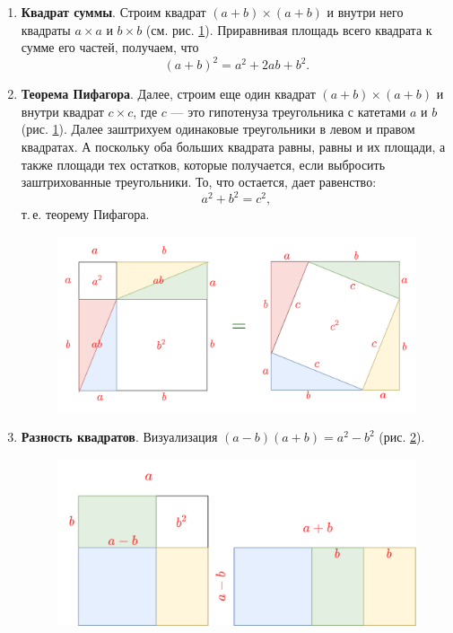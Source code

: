\begin{enumerate}
\item \textbf{Квадрат суммы}. Строим квадрат $(a+b)\times (a+b)$ и внутри него квадраты $a\times a$ и $b\times b$ (см. рис. \ref{pithagor}). Приравнивая площадь всего квадрата к сумме его частей, получаем, что
$$
(a+b)^2 = a^2 + 2ab + b^2.
$$
\item \textbf{Теорема Пифагора}. Далее, строим еще один квадрат $(a+b)\times (a+b)$ и внутри квадрат $c\times c$, где $c$ --- это гипотенуза треугольника с катетами $a$ и $b$ (рис. \ref{pithagor}). Далее заштрихуем одинаковые треугольники в левом и правом квадратах. А поскольку оба больших квадрата равны, равны и их площади, а также площади тех остатков, которые получается, если выбросить заштрихованные треугольники. То, что остается, дает равенство:
$$
a^2+b^2=c^2,
$$
т.\,е. теорему Пифагора.

\begin{figure}[hbt!]
\begin{center}
\includegraphics[scale=0.25]{pithagor.png}
\end{center}
\caption{}\label{pithagor}
\end{figure}

\item \textbf{Разность квадратов}. Визуализация $(a-b)(a+b)=a^2-b^2$ (рис. \ref{razn}).
\begin{figure}[hbt!]
\begin{center}
\includegraphics[scale=0.25]{razn.png}
\end{center}
\caption{}\label{razn}
\end{figure}


\end{enumerate}
